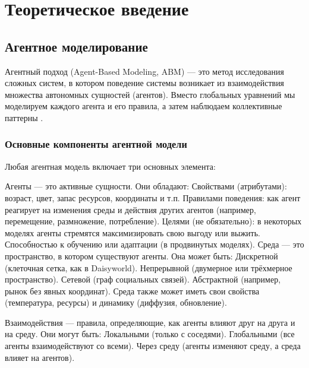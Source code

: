 \documentclass[
  english,
  russian,
  12pt,
  a4paper,
  DIV=11,
  numbers=noendperiod]{scrreprt}
\begin{document}
\chapter{Теоретическое
введение}\label{ux442ux435ux43eux440ux435ux442ux438ux447ux435ux441ux43aux43eux435-ux432ux432ux435ux434ux435ux43dux438ux435}

\section{Агентное
моделирование}\label{ux430ux433ux435ux43dux442ux43dux43eux435-ux43cux43eux434ux435ux43bux438ux440ux43eux432ux430ux43dux438ux435}

Агентный подход (Agent-Based Modeling, ABM) --- это метод исследования
сложных систем, в котором поведение системы возникает из взаимодействия
множества автономных сущностей (агентов). Вместо глобальных уравнений мы
моделируем каждого агента и его правила, а затем наблюдаем коллективные
паттерны \autocite{datseris2022agents}.

\subsection{Основные компоненты агентной
модели}\label{ux43eux441ux43dux43eux432ux43dux44bux435-ux43aux43eux43cux43fux43eux43dux435ux43dux442ux44b-ux430ux433ux435ux43dux442ux43dux43eux439-ux43cux43eux434ux435ux43bux438}

Любая агентная модель включает три основных элемента:

Агенты --- это активные сущности. Они обладают: Свойствами (атрибутами):
возраст, цвет, запас ресурсов, координаты и т.п. Правилами поведения:
как агент реагирует на изменения среды и действия других агентов
(например, перемещение, размножение, потребление). Целями (не
обязательно): в некоторых моделях агенты стремятся максимизировать свою
выгоду или выжить. Способностью к обучению или адаптации (в продвинутых
моделях). Среда --- это пространство, в котором существуют агенты. Она
может быть: Дискретной (клеточная сетка, как в Daisyworld). Непрерывной
(двумерное или трёхмерное пространство). Сетевой (граф социальных
связей). Абстрактной (например, рынок без явных координат). Среда также
может иметь свои свойства (температура, ресурсы) и динамику (диффузия,
обновление).

Взаимодействия --- правила, определяющие, как агенты влияют друг на
друга и на среду. Они могут быть: Локальными (только с соседями).
Глобальными (все агенты взаимодействуют со всеми). Через среду (агенты
изменяют среду, а среда влияет на агентов).
\end{document}
